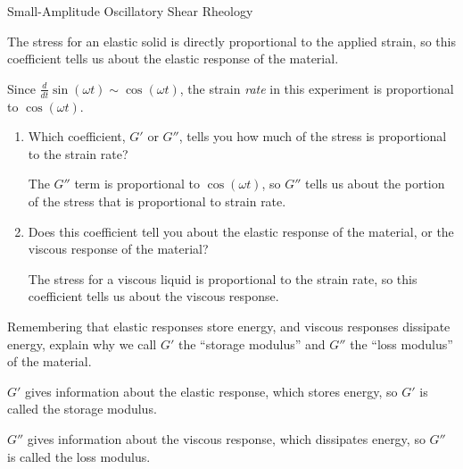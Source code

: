 \begin{activity}[extension]{Small-Amplitude Oscillatory Shear Rheology}
\begin{ctqs}
\begin{enumerate}
					\begin{solution}[1.1in]{}
						The stress for an elastic solid is directly proportional to the applied strain, so this coefficient tells us about the elastic response of the material.
					\end{solution}
					
			\end{enumerate}
		
		\question Since $\frac{d}{dt}\sin(\omega t) \sim \cos(\omega t)$, the strain \emph{rate} in this experiment is proportional to $\cos(\omega t)$.
		
			\begin{enumerate}
		
				\item Which coefficient, $G'$ or $G''$, tells you how much of the stress is proportional to the strain rate?
	
					\begin{solution}[1.1in]{}
						The $G''$ term is proportional to $\cos(\omega t)$, so $G''$ tells us about the portion of the stress that is proportional to strain rate.
					\end{solution}
		
				\item Does this coefficient tell you about the elastic response of the material, or the viscous response of the material?
	
					\begin{solution}[1.1in]{}
					
						The stress for a viscous liquid is proportional to the strain rate, so this coefficient tells us about the viscous response.
					
					\end{solution}
					
			\end{enumerate}
		
		\question Remembering that elastic responses store energy, and viscous responses dissipate energy, explain why we call $G'$ the ``storage modulus'' and $G''$ the ``loss modulus'' of the material.
	
					\begin{solution}[2in]{}
					
						$G'$ gives information about the elastic response, which stores energy, so $G'$ is called the storage modulus.
						
						$G''$ gives information about the viscous response, which dissipates energy, so $G''$ is called the loss modulus.
					\end{solution}
			

\end{ctqs}
\end{activity}
